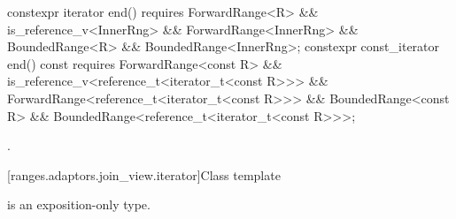 %
\begin{itemdecl}
constexpr iterator end() requires ForwardRange<R> &&
  is_reference_v<InnerRng> && ForwardRange<InnerRng> &&
  BoundedRange<R> && BoundedRange<InnerRng>;
constexpr const_iterator end() const requires ForwardRange<const R> &&
  is_reference_v<reference_t<iterator_t<const R>>> &&
  ForwardRange<reference_t<iterator_t<const R>>> &&
  BoundedRange<const R> && BoundedRange<reference_t<iterator_t<const R>>>;
\end{itemdecl}

\begin{itemdescr}
\pnum
\returns {}.
\end{itemdescr}

[ranges.adaptors.join_view.iterator]{Class template }

\pnum
{} is an exposition-only type.


